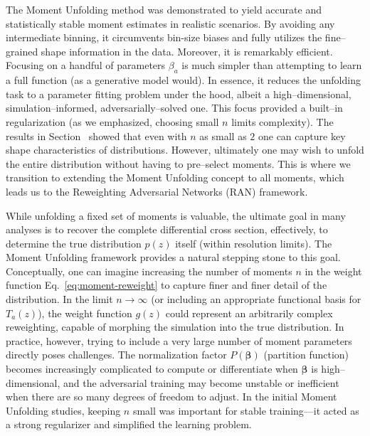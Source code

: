        The Moment Unfolding method was demonstrated to yield accurate and statistically stable moment estimates in realistic scenarios.
        By avoiding any intermediate binning, it circumvents bin-size biases and fully utilizes the fine--grained shape information in the data.
        Moreover, it is remarkably efficient.
        Focusing on a handful of parameters $\beta_a$ is much simpler than attempting to learn a full function (as a generative model would).
        In essence, it reduces the unfolding task to a parameter fitting problem under the hood, albeit a high--dimensional, simulation--informed, adversarially--solved one. This focus provided a built--in regularization (as we emphasized, choosing small $n$ limits complexity).
        The results in Section~ showed that even with $n$ as small as \(2\) one can capture key shape characteristics of distributions.
        However, ultimately one may wish to unfold the entire distribution without having to pre--select moments.
        This is where we transition to extending the Moment Unfolding concept to all moments, which leads us to the Reweighting Adversarial Networks (RAN) framework.

        While unfolding a fixed set of moments is valuable, the ultimate goal in many analyses is to recover the complete differential cross section, effectively, to determine the true distribution $p(z)$ itself (within resolution limits).
        The Moment Unfolding framework provides a natural stepping stone to this goal. Conceptually, one can imagine increasing the number of moments $n$ in the weight function Eq.~\ref{eq:moment-reweight} to capture finer and finer detail of the distribution.
        In the limit $n \to \infty$ (or including an appropriate functional basis for $T_a(z)$), the weight function $g(z)$ could represent an arbitrarily complex reweighting, capable of morphing the simulation into the true distribution.
        In practice, however, trying to include a very large number of moment parameters directly poses challenges.
        The normalization factor $P(\boldsymbol{\beta})$ (partition function) becomes increasingly complicated to compute or differentiate when $\boldsymbol{\beta}$ is high--dimensional, and the adversarial training may become unstable or inefficient when there are so many degrees of freedom to adjust.
        In the initial Moment Unfolding studies, keeping $n$ small was important for stable training---it acted as a strong regularizer and simplified the learning problem.\kd{}
        
